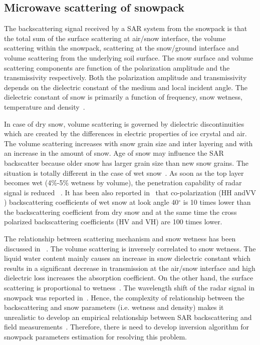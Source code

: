 \subsection{Microwave scattering of snowpack}
The backscattering signal received by a SAR system from the snowpack is that the total sum of the surface scattering at air/snow interface, the volume scattering within the snowpack, scattering at the snow/ground interface and volume scattering from the underlying soil surface. The snow surface and volume scattering components are function of the polarization amplitude and the transmissivity respectively. Both the polarization amplitude and transmissivity depends on the dielectric constant of the medium and local incident angle. The dielectric constant of snow is primarily a function of frequency, snow wetness, temperature and density~\citep{ulaby1986microwave,hallikainen1986dielectric}. 

In case of dry snow, volume scattering is governed by dielectric discontinuities which are created by the differences in electric properties of ice crystal and air. The volume scattering increases with snow grain size and inter layering and with an increase in the amount of snow. Age of snow may influence the SAR backscatter because older snow has larger grain size than new snow grains.
The situation is totally different in the case of wet snow~\citep{ulaby1980active,stiles1980dielectric,matzler1984snow}. As soon as the top layer becomes wet (4$\%$-5$\%$ wetness by volume), the penetration capability of radar signal is reduced ~\citep{matzler1984snow}. It has been also reported in~\citep{matzler1984snow} that co-polarization ($\mbox{HH}$ and$\mbox{VV}$) backscattering coefficients of wet snow at look angle 40$^\circ$ is 10 times lower than the backscattering coefficient from dry snow and at the same time the cross polarized backscattering coefficients ($\mbox{HV}$ and $\mbox{VH}$) are 100 times lower. 

The relationship between scattering mechanism and snow wetness has been discussed in ~\citep{Shi93}. The volume scattering is inversely correlated to snow wetness. The liquid water content mainly causes an increase in snow dielectric constant which results in a significant decrease in transmission at the air/snow interface and  high dielectric loss increases the absorption coefficient. On the other hand, the surface scattering is proportional to wetness~\citep{shi1995sir}. The wavelength shift of the radar signal in snowpack was reported in~\citep{shi2000depth}. Hence, the complexity of relationship between the backscattering and snow parameters (i.e. wetness and density) makes it unrealistic to develop an empirical relationship between SAR backscattering and field measurements~\citep{singh2007envisat}. Therefore, there is need to develop inversion algorithm for snowpack parameters estimation for resolving this problem. 
  
